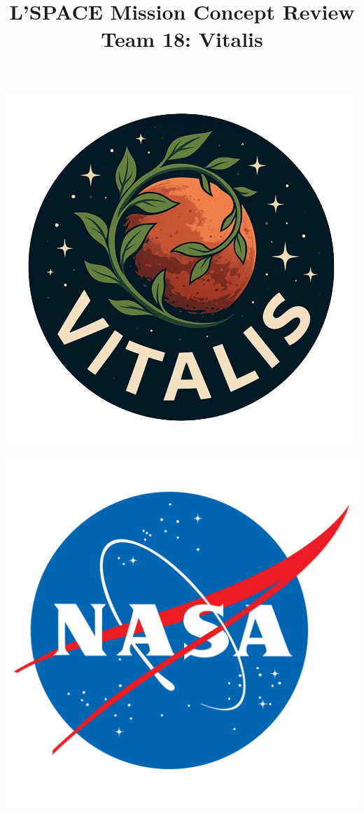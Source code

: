 \documentclass[12pt]{article}
\begin{document}
\title{L'SPACE Mission Concept Review\\\large Team 18: Vitalis}
\author{}
\date{}

\maketitle 
\begin{center}
\begin{minipage}{0.45\linewidth}
    \centering
    \includegraphics[width=0.9\linewidth]{images/newvitalis.png}
\end{minipage}%
\hspace{0.05\linewidth}
\begin{minipage}{0.45\linewidth}
    \centering
    \includegraphics[width=0.9\linewidth]{images/nasa.png}
\end{minipage}
\end{center}
\end{document}
